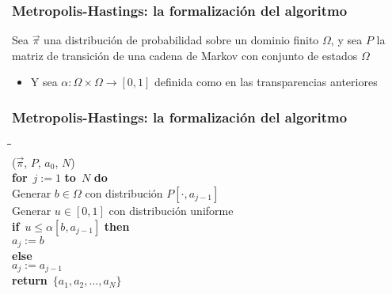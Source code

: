 \documentclass{beamer}
\newcommand{\vs}[1]{\vspace{#1mm}}
\newcommand{\afor}{{\bf for}\ }
\newcommand{\ato}{{\bf to}\ }
\newcommand{\ado}{{\bf do}\ }
\newcommand{\aif}{{\bf if}\ }
\newcommand{\athen}{{\bf then}\ }
\newcommand{\aelse}{{\bf else}\ }
\newcommand{\areturn}{{\bf return}\ }
\begin{document}
	
	
	
	\begin{frame}
		\frametitle{Metropolis-Hastings: la formalización del algoritmo}
		
		{\footnotesize
			
			
			Sea $\vec \pi$ una distribución de probabilidad sobre un dominio finito $\Omega$, y sea $P$ la matriz de transición de una cadena de Markov con conjunto de estados $\Omega$
			\begin{itemize}
				\item Y sea $\alpha: \Omega\times\Omega \to [0,1]$ definida como en las transparencias anteriores
			\end{itemize}
			
			\vs{6}
			
			
			\vs{6}
			
			
		}
		
	\end{frame}
	
	
	
	
	
	\begin{frame}
		\frametitle{Metropolis-Hastings: la formalización del algoritmo}
		
		{\small
			
			\begin{tabbing}
				\phantom{MM}\=\phantom{MM}\=\phantom{MM}\=\phantom{MM}\= \\
				($\vec \pi$, $P$, $a_0$, $N$) \\
				\> \afor $j:=1$ \ato $N$ \ado \\
				\> \> Generar $b \in \Omega$ con distribución $P[\cdot, a_{j-1}]$\\
				\> \> Generar $u \in [0,1]$ con distribución uniforme\\
				\> \> \aif $u \leq \alpha[b,a_{j-1}]$ \athen \\
				\> \> \> $a_{j} := b$ \\
				\> \> \aelse \\
				\> \> \> $a_{j} := a_{j-1}$ \\
				\> \areturn $\{a_1, a_2, \ldots, a_N\}$
			\end{tabbing}
			
		}
		
	\end{frame}
	
\end{document}
